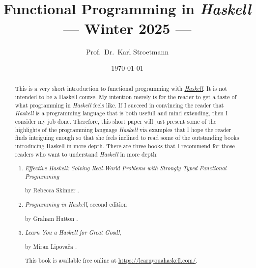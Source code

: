 \documentclass[11pt]{report}
\title{\epsfig{file=dhbw-logo.pdf, scale=1.5}\\[0.3cm]  
       Functional Programming in \textsl{Haskell} \\[0.3cm]
      --- Winter 2025 ---}
\author{Prof.~Dr.~Karl Stroetmann}
\date{\today \\[1.5cm]
  \dangersign \wip \dangersign
}
\begin{document}
\maketitle

\begin{abstract}
\noindent
This is a very short introduction to functional programming with
\href{https://en.wikipedia.org/wiki/Haskell}{\textsl{Haskell}}. 
It is not intended to be a Haskell course.  My intention merely is for the reader to get a taste of what
programming in \textsl{Haskell} feels like.  If I succeed in convincing the reader that \textsl{Haskell} is a
programming language that is both usefull and mind extending, then I consider my job done.
Therefore, this short paper will just present some of the highlights of the programming language
\textsl{Haskell} via examples that I hope the reader finds intriguing enough so that she feels inclined to read
some of the outstanding books introducing Haskell in more depth.  There are three books that I recommend for
those readers who want to understand \textsl{Haskell} in more depth:
\begin{enumerate}
\item \emph{Effective Haskell: Solving Real-World Problems with Strongly Typed Functional Programming} 

      by Rebecca Skinner \cite{skinner:2023}.
\item \emph{Programming in Haskell}, second edition 

      by Graham Hutton \cite{hutton:2016}.
  
\item \emph{Learn You a Haskell for Great Good!},

      by Miran Lipova\v{c}a \cite{lipovaca:2011}.

      This book is available free online at
      \href{https://learnyouahaskell.com/}{https://learnyouahaskell.com/}.
\end{enumerate}
\end{abstract}






\end{document}
